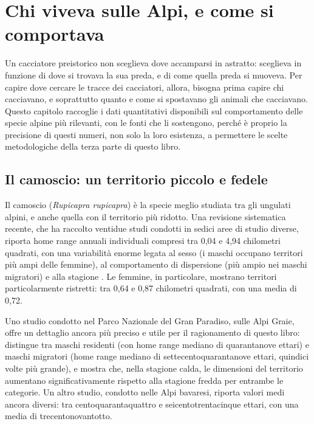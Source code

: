 \chapter{Chi viveva sulle Alpi, e come si comportava}
\label{cap:specie_alpine}

Un cacciatore preistorico non sceglieva dove accamparsi in astratto: sceglieva in funzione di dove si trovava la sua preda, e di come quella preda si muoveva. Per capire dove cercare le tracce dei cacciatori, allora, bisogna prima capire chi cacciavano, e soprattutto quanto e come si spostavano gli animali che cacciavano. Questo capitolo raccoglie i dati quantitativi disponibili sul comportamento delle specie alpine più rilevanti, con le fonti che li sostengono, perché è proprio la precisione di questi numeri, non solo la loro esistenza, a permettere le scelte metodologiche della terza parte di questo libro.

\section{Il camoscio: un territorio piccolo e fedele}

Il camoscio (\textit{Rupicapra rupicapra}) è la specie meglio studiata tra gli ungulati alpini, e anche quella con il territorio più ridotto. Una revisione sistematica recente, che ha raccolto ventidue studi condotti in sedici aree di studio diverse, riporta home range annuali individuali compresi tra 0,04 e 4,94 chilometri quadrati, con una variabilità enorme legata al sesso (i maschi occupano territori più ampi delle femmine), al comportamento di dispersione (più ampio nei maschi migratori) e alla stagione \citep{papakostas2026}. Le femmine, in particolare, mostrano territori particolarmente ristretti: tra 0,64 e 0,87 chilometri quadrati, con una media di 0,72.

Uno studio condotto nel Parco Nazionale del Gran Paradiso, sulle Alpi Graie, offre un dettaglio ancora più preciso e utile per il ragionamento di questo libro: distingue tra maschi residenti (con home range mediano di quarantanove ettari) e maschi migratori (home range mediano di settecentoquarantanove ettari, quindici volte più grande), e mostra che, nella stagione calda, le dimensioni del territorio aumentano significativamente rispetto alla stagione fredda per entrambe le categorie. Un altro studio, condotto nelle Alpi bavaresi, riporta valori medi ancora diversi: tra centoquarantaquattro e seicentotrentacinque ettari, con una media di trecentonovantotto.

